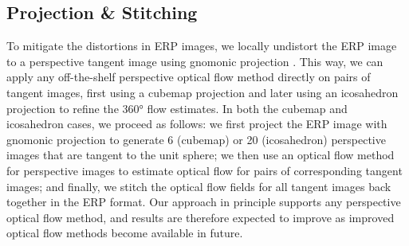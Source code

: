 \subsection{Projection \& Stitching}
\label{sec:approach:projstit}

To mitigate the distortions in ERP images, we locally undistort the ERP image to a perspective tangent image using gnomonic projection \cite{EderSLF2020}.
This way, we can apply any off-the-shelf perspective optical flow method directly on pairs of tangent images, first using a cubemap projection and later using an icosahedron projection to refine the 360° flow estimates.
%
In both the cubemap and icosahedron cases, we proceed as follows:
we first project the ERP image with gnomonic projection to generate 6 (cubemap) or 20 (icosahedron) perspective images that are tangent to the unit sphere;
we then use an optical flow method for perspective images to estimate optical flow for pairs of corresponding tangent images; and
finally, we stitch the optical flow fields for all tangent images back together in the ERP format.
%
Our approach in principle supports any perspective optical flow method, and results are therefore expected to improve as improved optical flow methods become available in future.

\vspace{-1em}
